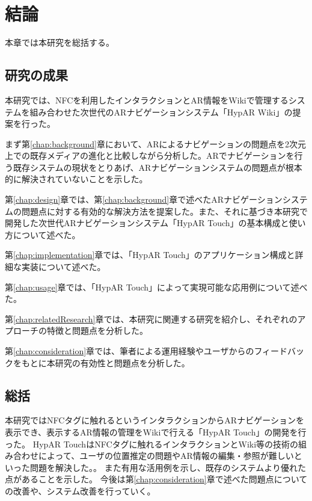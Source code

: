 \chapter{結論}
\label{chap:conclusion}

本章では本研究を総括する。

\newpage



\section{研究の成果}
本研究では、NFCを利用したインタラクションとAR情報をWikiで管理するシステムを組み合わせた次世代のARナビゲーションシステム「HypAR Wiki」の提案を行った。

まず第\ref{chap:background}章において、ARによるナビゲーションの問題点を2次元上での既存メディアの進化と比較しながら分析した。ARでナビゲーションを行う既存システムの現状をとりあげ、ARナビゲーションシステムの問題点が根本的に解決されていないことを示した。

第\ref{chap:design}章では、第\ref{chap:background}章で述べたARナビゲーションシステムの問題点に対する有効的な解決方法を提案した。また、それに基づき本研究で開発した次世代ARナビゲーションシステム「HypAR Touch」の基本構成と使い方について述べた。

第\ref{chap:implementation}章では、「HypAR Touch」のアプリケーション構成と詳細な実装について述べた。

第\ref{chap:usage}章では、「HypAR Touch」によって実現可能な応用例について述べた。

第\ref{chap:relatedResearch}章では、本研究に関連する研究を紹介し、それぞれのアプローチの特徴と問題点を分析した。

第\ref{chap:consideration}章では、筆者による運用経験やユーザからのフィードバックをもとに本研究の有効性と問題点を分析した。

\section{総括}
本研究ではNFCタグに触れるというインタラクションからARナビゲーションを表示でき、表示するAR情報の管理をWikiで行える「HypAR Touch」の開発を行った。
HypAR TouchはNFCタグに触れるインタラクションとWiki等の技術の組み合わせによって、ユーザの位置推定の問題やAR情報の編集・参照が難しいといった問題を解決した。。
また有用な活用例を示し、既存のシステムより優れた点があることを示した。
今後は第\ref{chap:consideration}章で述べた問題点についての改善や、システム改善を行っていく。